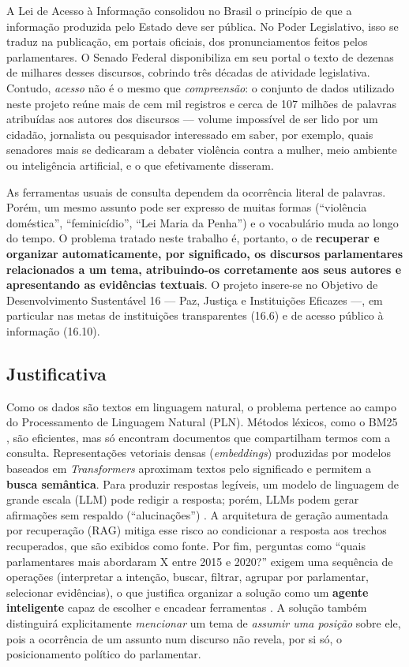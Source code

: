 \documentclass[12pt]{article}
\begin{document}
A Lei de Acesso à Informação \cite{brasil2011} consolidou no Brasil o princípio de que a
informação produzida pelo Estado deve ser pública. No Poder Legislativo, isso se traduz na
publicação, em portais oficiais, dos pronunciamentos feitos pelos parlamentares. O Senado Federal
disponibiliza em seu portal o texto de dezenas de milhares desses discursos, cobrindo três
décadas de atividade legislativa. Contudo, \emph{acesso} não é o mesmo que \emph{compreensão}: o
conjunto de dados utilizado neste projeto reúne mais de cem mil registros e cerca de 107 milhões
de palavras atribuídas aos autores dos discursos --- volume impossível de ser lido por um
cidadão, jornalista ou pesquisador interessado em saber, por exemplo, quais senadores mais se
dedicaram a debater violência contra a mulher, meio ambiente ou inteligência artificial, e o que
efetivamente disseram.

As ferramentas usuais de consulta dependem da ocorrência literal de palavras. Porém, um mesmo
assunto pode ser expresso de muitas formas (``violência doméstica'', ``feminicídio'', ``Lei Maria
da Penha'') e o vocabulário muda ao longo do tempo. O problema tratado neste trabalho é, portanto,
o de \textbf{recuperar e organizar automaticamente, por significado, os discursos parlamentares
relacionados a um tema, atribuindo-os corretamente aos seus autores e apresentando as evidências
textuais}. O projeto insere-se no Objetivo de Desenvolvimento Sustentável 16 --- Paz, Justiça e
Instituições Eficazes \cite{onu2015} ---, em particular nas metas de instituições transparentes
(16.6) e de acesso público à informação (16.10).

\subsection{Justificativa}

Como os dados são textos em linguagem natural, o problema pertence ao campo do Processamento de
Linguagem Natural (PLN). Métodos léxicos, como o BM25 \cite{robertson2009}, são eficientes, mas
só encontram documentos que compartilham termos com a consulta. Representações vetoriais densas
(\textit{embeddings}) produzidas por modelos baseados em \textit{Transformers}
\cite{vaswani2017,reimers2019,wang2024e5} aproximam textos pelo significado e permitem a
\textbf{busca semântica}. Para produzir respostas legíveis, um modelo de linguagem de grande
escala (LLM) pode redigir a resposta; porém, LLMs podem gerar afirmações sem respaldo
(``alucinações'') \cite{ji2023}. A arquitetura de geração aumentada por recuperação (RAG)
\cite{lewis2020} mitiga esse risco ao condicionar a resposta aos trechos recuperados, que são
exibidos como fonte. Por fim, perguntas como ``quais parlamentares mais abordaram X entre 2015 e
2020?'' exigem uma sequência de operações (interpretar a intenção, buscar, filtrar, agrupar por
parlamentar, selecionar evidências), o que justifica organizar a solução como um \textbf{agente
inteligente} \cite{russell2022} capaz de escolher e encadear ferramentas \cite{yao2023}.
A solução também distinguirá explicitamente \emph{mencionar} um tema de \emph{assumir uma posição}
sobre ele, pois a ocorrência de um assunto num discurso não revela, por si só, o posicionamento
político do parlamentar.
\end{document}
